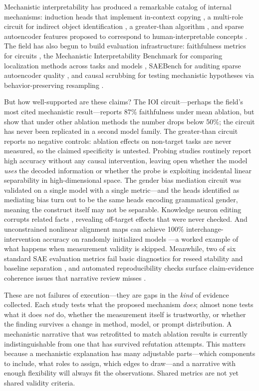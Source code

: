 \documentclass{article}
\begin{document}
Mechanistic interpretability has produced a remarkable catalog of internal mechanisms:
induction heads that implement in-context copying \citep{olsson2022context}, a multi-role
circuit for indirect object identification \citep{wang2023interpretability}, a greater-than
algorithm \citep{hanna2023greater}, and sparse autoencoder features proposed to correspond
to human-interpretable concepts \citep{cunningham2023sparse, bricken2024monosemanticity}. The field has also begun to
build evaluation infrastructure: faithfulness metrics for circuits
\citep{miller2024transformer}, the Mechanistic Interpretability Benchmark for comparing
localization methods across tasks and models \citep{mueller2025mib}, SAEBench for auditing
sparse autoencoder quality \citep{karvonen2025saebench}, and causal scrubbing for testing
mechanistic hypotheses via behavior-preserving resampling \citep{chan2022causal}.

But how well-supported are these claims? The IOI circuit---perhaps the field's most cited
mechanistic result---reports 87\% faithfulness under mean ablation, but
\citet{miller2024transformer} show that under other ablation methods the number drops below
50\%; the circuit has never been replicated in a second model family. The greater-than
circuit reports no negative controls: ablation effects on non-target tasks are never
measured, so the claimed specificity is untested. Probing studies routinely report high
accuracy without any causal intervention, leaving open whether the model \emph{uses} the
decoded information or whether the probe is exploiting incidental linear separability in
high-dimensional space. The gender bias mediation circuit was validated on a single model
with a single metric---and the heads identified as mediating bias turn out to be the same
heads encoding grammatical gender, meaning the construct itself may not be separable.
Knowledge neuron editing corrupts related facts \citep{dai2022knowledge}, revealing
off-target effects that were never checked. And unconstrained nonlinear alignment maps can
achieve 100\% interchange-intervention accuracy on randomly initialized models
\citep{sutter2025nonlinear}---a worked example of what happens when measurement validity is
skipped. Meanwhile, two of six standard SAE evaluation metrics fail basic diagnostics for
reseed stability and baseline separation \citep{karvonen2025saebench}, and automated
reproducibility checks surface claim-evidence coherence issues that narrative review misses
\citep{bai2026mecheval}.

These are not failures of execution---they are gaps in the \emph{kind} of evidence
collected. Each study tests what the proposed mechanism \emph{does}; almost none tests what
it does \emph{not} do, whether the measurement itself is trustworthy, or whether the
finding survives a change in method, model, or prompt distribution. A mechanistic
narrative that was retrofitted to match ablation results is currently indistinguishable
from one that has survived refutation attempts. This matters because a mechanistic
explanation has many adjustable parts---which components to include, what roles to assign,
which edges to draw---and a narrative with enough flexibility will always fit the
observations. Shared metrics are not yet shared validity criteria.
\end{document}
